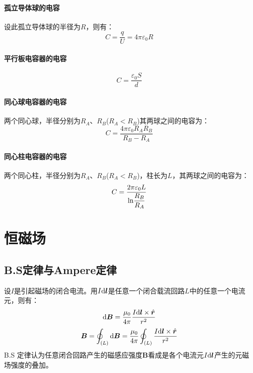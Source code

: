 \documentclass[UTF8,AutoFakeBold,b5paper]{ctexbook}
\begin{document}
\subsubsection{孤立导体球的电容}
设此孤立导体球的半径为$R$，则有：
\begin{equation}
		C = \dfrac{q}{U} = 4\pi\varepsilon_{0}R
\end{equation}
\subsubsection{平行板电容器的电容}
\begin{equation}
	C = \dfrac{\varepsilon_{0}S}{d}
\end{equation}
\subsubsection{同心球电容器的电容}
两个同心球，半径分别为$R_{A}$、$R_{B}$($R_{A}<R_{B}$)其两球之间的电容为：
\begin{equation}
	C = \dfrac{4\pi\varepsilon_{0}R_{A}R_{B}}{R_{B}-R_{A}}
\end{equation}
\subsubsection{同心柱电容器的电容}
两个同心柱，半径分别为$R_{A}$、$R_{B}$($R_{A}<R_{B}$)，柱长为$L$，其两球之间的电容为：
\begin{equation}
	C =\dfrac{2\pi\varepsilon_{0}L}{\ce{ln}\dfrac{R_{B}}{R_{A}}}
\end{equation}
\chapter{恒磁场}
\section{B.S定律与Ampere定律}
设$I$是引起磁场的闭合电流。用$I\ce{d}\bm{l}$是任意一个闭合载流回路$L$中的任意一个电流元，则有：
\begin{equation}
	\ce{d}\bm{B} = \dfrac{\mu_{0}}{4\pi}\dfrac{I\ce{d}\bm{l}\times\hat{\bm{r}}}{r^{2}}
\end{equation}
\begin{equation}
	\bm{B} = \oint_{(L)}\ce{d}\bm{B} =\dfrac{\mu_{0}}{4\pi} \oint_{(L)}\dfrac{I\ce{d}\bm{l}\times\hat{\bm{r}}}{r^{2}}
\end{equation}
\textcolor[rgb]{0.56,0.28,0.16}{B.S 定律认为任意闭合回路产生的磁感应强度$\bm{B}$看成是各个电流元$I\ce{d}\bm{l}$产生的元磁场强度的叠加。}
\end{document}
